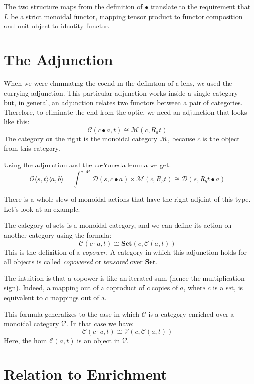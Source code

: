 \documentclass[11pt]{amsart}
\begin{document}
The two structure maps from the definition of $\bullet$ translate to the requirement that $L$ be a strict monoidal functor, mapping tensor product to functor composition and unit object to identity functor.

\section{The Adjunction}

When we were eliminating the coend in the definition of a lens, we used the currying adjunction. This particular adjunction works inside a single category but, in general, an adjunction relates two functors between a pair of categories. Therefore, to eliminate the end from the optic, we need an adjunction that looks like this:
\[ \mathcal{C}(c \bullet a, t) \cong \mathcal{M}(c, R_a t) \]
The category on the right is the monoidal category $\mathcal{M}$, because $c$ is the object from this category. 

Using the adjunction and the co-Yoneda lemma we get:
\[ \mathcal{O}\langle s, t\rangle \langle a, b \rangle = \int^{c \colon \mathcal{M}} \mathcal{D}(s, c \bullet a) \times  \mathcal{M}(c, R_b t) \cong  \mathcal{D}(s, R_b t \bullet a) \]


There is a whole slew of monoidal actions that have the right adjoint of this type. Let's look at an example.

The category of sets is a monoidal category, and we can define its action on another category using the formula:
\[ \mathcal{C}(c \cdot a, t) \cong \mathbf{Set}(c, \mathcal{C}(a, t)) \]
This is the definition of a \emph{copower}. A category in which this adjunction holds for all objects is called \emph{copowered} or \emph{tensored} over $\mathbf{Set}$. 

The intuition is that a copower is like an iterated sum (hence the multiplication sign). Indeed, a mapping out of a coproduct of $c$ copies of $a$, where $c$ is a set, is equivalent to $c$ mappings out of $a$. 

This formula generalizes to the case in which $\mathcal{C}$ is a category enriched over a monoidal category $\mathcal{V}$. In that case we have:
\[ \mathcal{C}(c \cdot a, t) \cong \mathcal{V}(c, \mathcal{C}(a, t)) \]
Here, the hom $\mathcal{C}(a, t)$ is an object in $\mathcal{V}$.

\section{Relation to Enrichment}
\end{document}
